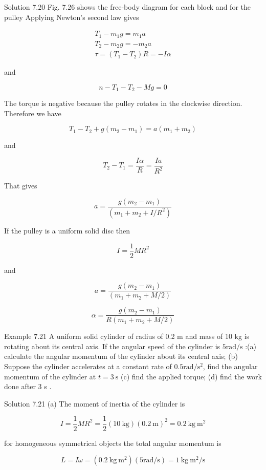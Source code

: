 \documentclass[10pt]{article}
\begin{document}
Solution 7.20 Fig. 7.26 shows the free-body diagram for each block and for the pulley Applying Newton's second law gives

$$
\begin{gathered}
T_{1}-m_{1} g=m_{1} a \\
T_{2}-m_{2} g=-m_{2} a \\
\tau=\left(T_{1}-T_{2}\right) R=-I \alpha
\end{gathered}
$$

and

$$
n-T_{1}-T_{2}-M g=0
$$

The torque is negative because the pulley rotates in the clockwise direction. Therefore we have

$$
T_{1}-T_{2}+g\left(m_{2}-m_{1}\right)=a\left(m_{1}+m_{2}\right)
$$

and

$$
T_{2}-T_{1}=\frac{I \alpha}{R}=\frac{I a}{R^{2}}
$$

That gives

$$
a=\frac{g\left(m_{2}-m_{1}\right)}{\left(m_{1}+m_{2}+I / R^{2}\right)}
$$

If the pulley is a uniform solid disc then

$$
I=\frac{1}{2} M R^{2}
$$

and

$$
a=\frac{g\left(m_{2}-m_{1}\right)}{\left(m_{1}+m_{2}+M / 2\right)}
$$

$$
\alpha=\frac{g\left(m_{2}-m_{1}\right)}{R\left(m_{1}+m_{2}+M / 2\right)}
$$

Example 7.21 A uniform solid cylinder of radius of 0.2 m and mass of 10 kg is rotating about its central axis. If the angular speed of the cylinder is $5 \mathrm{rad} / \mathrm{s}$ :(a) calculate the angular momentum of the cylinder about its central axis; (b) Suppose the cylinder accelerates at a constant rate of $0.5 \mathrm{rad} / \mathrm{s}^{2}$, find the angular momentum of the cylinder at $t=3 \mathrm{~s}$ (c) find the applied torque; (d) find the work done after 3 s .

Solution 7.21 (a) The moment of inertia of the cylinder is

$$
I=\frac{1}{2} M R^{2}=\frac{1}{2}(10 \mathrm{~kg})(0.2 \mathrm{~m})^{2}=0.2 \mathrm{~kg} \mathrm{~m}^{2}
$$

for homogeneous symmetrical objects the total angular momentum is

$$
L=I \omega=\left(0.2 \mathrm{~kg} \mathrm{~m}^{2}\right)(5 \mathrm{rad} / \mathrm{s})=1 \mathrm{~kg} \mathrm{~m}^{2} / \mathrm{s}
$$
\end{document}
